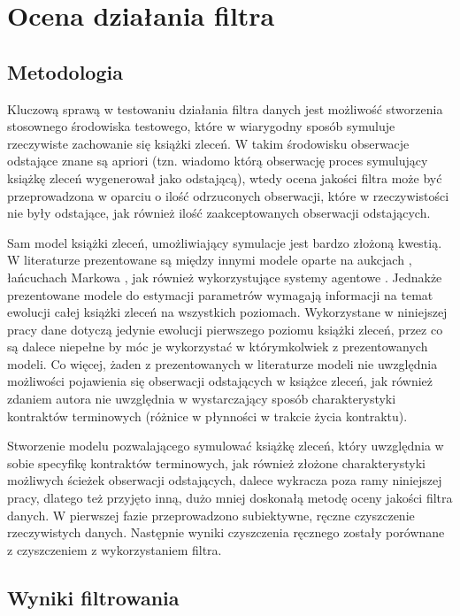 \documentclass[a4paper,12pt,openany, DIV=calc, headsepline]{scrbook}
\begin{document}
\chapter{Ocena działania filtra}

\section{Metodologia}

Kluczową sprawą w testowaniu działania filtra danych jest możliwość stworzenia stosownego środowiska testowego, które w wiarygodny sposób symuluje rzeczywiste zachowanie się książki zleceń. W takim środowisku obserwacje odstające znane są apriori (tzn. wiadomo którą obserwację proces symulujący książkę zleceń wygenerował jako odstającą), wtedy ocena jakości filtra może być przeprowadzona w oparciu o ilość odrzuconych obserwacji, które w rzeczywistości nie były odstające, jak również ilość zaakceptowanych obserwacji odstających.

Sam model książki zleceń, umożliwiający symulacje jest bardzo złożoną kwestią. W literaturze prezentowane są między innymi modele oparte na aukcjach \citep{doubleAuction}, łańcuchach Markowa \citep{huang2015simulating}, jak również wykorzystujące systemy agentowe \citep{chiarella2009impact}. Jednakże prezentowane modele do estymacji parametrów wymagają informacji na temat ewolucji całej książki zleceń na wszystkich poziomach. Wykorzystane w niniejszej pracy dane dotyczą jedynie ewolucji pierwszego poziomu książki zleceń, przez co są dalece niepełne by móc je wykorzystać w którymkolwiek z prezentowanych modeli. Co więcej, żaden z prezentowanych w literaturze modeli nie uwzględnia możliwości pojawienia się obserwacji odstających w książce zleceń, jak również zdaniem autora nie uwzględnia w wystarczający sposób charakterystyki kontraktów terminowych (różnice w płynności w trakcie życia kontraktu). 

Stworzenie modelu pozwalającego symulować książkę zleceń, który uwzględnia w sobie specyfikę kontraktów terminowych, jak również złożone charakterystyki możliwych ścieżek obserwacji odstających, dalece wykracza poza ramy niniejszej pracy, dlatego też przyjęto inną, dużo mniej doskonałą metodę oceny jakości filtra danych. W pierwszej fazie przeprowadzono subiektywne, ręczne czyszczenie rzeczywistych danych. Następnie wyniki czyszczenia ręcznego zostały porównane z czyszczeniem z wykorzystaniem filtra. 

\section{Wyniki filtrowania}
\end{document}
